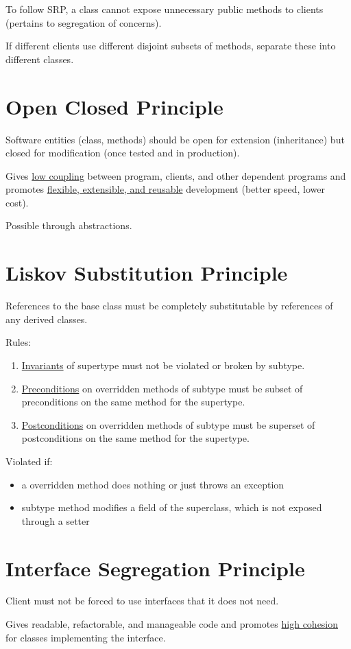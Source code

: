 \documentclass[11pt]{article}
\begin{document}
To follow SRP, a class cannot expose unnecessary public methods to clients (pertains to
segregation of concerns).

If different clients use different disjoint subsets of methods, separate these into different
classes.
\section{Open Closed Principle}
\label{sec:org4d8fe1e}
Software entities (class, methods) should be open for extension (inheritance) but
closed for modification (once tested and in production).

Gives \uline{low coupling} between program, clients, and other dependent programs and
promotes \uline{flexible, extensible, and reusable} development (better speed, lower cost).

Possible through abstractions.
\section{Liskov Substitution Principle}
\label{sec:org1c05336}
References to the base class must be completely substitutable by references of any
derived classes.

Rules:
\begin{enumerate}
\item \uline{Invariants} of supertype must not be violated or broken by subtype.
\item \uline{Preconditions} on overridden methods of subtype must be subset of preconditions
on the same method for the supertype.
\item \uline{Postconditions} on overridden methods of subtype must be superset of postconditions
on the same method for the supertype.
\end{enumerate}

Violated if:
\begin{itemize}
\item a overridden method does nothing or just throws an exception
\item subtype method modifies a field of the superclass, which is not exposed through a
setter
\end{itemize}
\section{Interface Segregation Principle}
\label{sec:org166af27}
Client must not be forced to use interfaces that it does not need.

Gives readable, refactorable, and manageable code and promotes \uline{high cohesion} for classes
implementing the interface.
\end{document}
